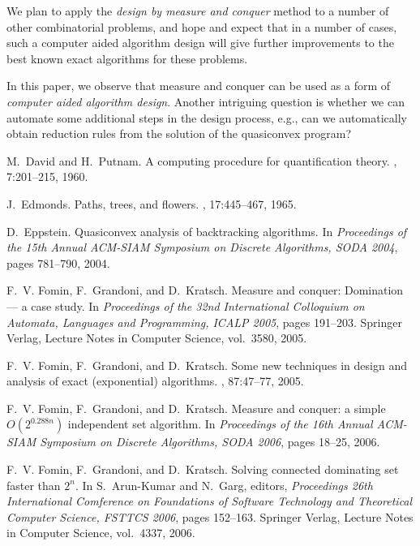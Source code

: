 \documentclass[fleqn]{stacs_proc}
\begin{document}
We plan to apply the {\em design by measure and conquer} method to a number of other combinatorial
problems, and hope and expect that in a number of cases, such a computer aided algorithm design
will give further improvements to the best known exact algorithms for these problems.

In this paper, we observe that measure and conquer can be used as a form of
{\em computer aided algorithm design}.
Another intriguing question is whether we can automate some additional steps in the
design process, e.g., can we automatically obtain reduction rules from the 
solution of the quasiconvex program?


\begin{thebibliography}{10}

M.~David and H.~Putnam.
\newblock A computing procedure for quantification theory.
, 7:201--215, 1960.

J.~Edmonds.
\newblock Paths, trees, and flowers.
, 17:445--467, 1965.

D.~Eppstein.
\newblock Quasiconvex analysis of backtracking algorithms.
\newblock In {\em Proceedings of the 15th Annual ACM-SIAM Symposium on Discrete
  Algorithms, SODA 2004}, pages 781--790, 2004.

F.~V. Fomin, F.~Grandoni, and D.~Kratsch.
\newblock Measure and conquer: Domination --- a case study.
\newblock In {\em Proceedings of the 32nd International Colloquium on Automata,
  Languages and Programming, ICALP 2005}, pages 191--203. Springer Verlag,
  Lecture Notes in Computer Science, vol.\ 3580, 2005.

F.~V. Fomin, F.~Grandoni, and D.~Kratsch.
\newblock Some new techniques in design and analysis of exact (exponential)
  algorithms.
, 87:47--77, 2005.

F.~V. Fomin, F.~Grandoni, and D.~Kratsch.
\newblock Measure and conquer: a simple {$O(2^{0.288n})$} independent set
  algorithm.
\newblock In {\em Proceedings of the 16th Annual ACM-SIAM Symposium on Discrete
  Algorithms, SODA 2006}, pages 18--25, 2006.

F.~V. Fomin, F.~Grandoni, and D.~Kratsch.
\newblock Solving connected dominating set faster than $2^n$.
\newblock In S.~Arun-Kumar and N.~Garg, editors, {\em Proceedings 26th
  International Comference on Foundations of Software Technology and
  Theoretical Computer Science, FSTTCS 2006}, pages 152--163. Springer Verlag,
  Lecture Notes in Computer Science, vol.\ 4337, 2006.


\end{thebibliography}
\end{document}
